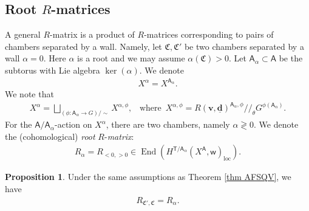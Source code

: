 \documentclass[10pt]{amsart}
\theoremstyle{definition}
\newtheorem{Proposition}[Theorem]{Proposition}
\numberwithin{equation}{section}
\newcommand{\bR}{\mathbb{R}}
\newcommand{\bZ}{\mathbb{Z}}
\newcommand{\bv}{\mathbf{v}}
\newcommand{\bd}{\mathbf{d}}
\newcommand{\fC}{\mathfrak{C}}
\newcommand{\sA}{\mathsf{A}}
\newcommand{\sT}{\mathsf{T}}
\newcommand{\sw}{\mathsf{w}}
\newcommand{\End}{\operatorname{End}}
\begin{document}
\subsection{Root \texorpdfstring{$R$}{R}-matrices}
A general $R$-matrix is a product of $R$-matrices corresponding to pairs of chambers separated by a wall. Namely, let $\fC,\fC'$ be two chambers separated by a wall $\alpha=0$. Here $\alpha$ is a root and we may assume $\alpha(\fC)>0$. Let $\sA_\alpha\subset \sA$ be the subtorus with Lie algebra $\ker(\alpha)$. We denote
\begin{align*}
    X^\alpha=X^{\sA_\alpha}.
\end{align*}
We note that
\begin{align*}
    X^\alpha=\bigsqcup_{(\phi\colon \sA_\alpha\to G)/\sim} X^{\alpha,\phi},\,\,\, \text{ where }\, X^{\alpha,\phi}=R(\bv,\underline{\bd})^{\sA_\alpha,\phi}/\!\!/_\theta G^{\phi(\sA_\alpha)}.
\end{align*}
For the $\sA/\sA_\alpha$-action on $X^\alpha$, there are two chambers, namely $\alpha\gtrless 0$. We denote the (cohomological) \textit{root} $R$-\textit{matrix}: 
\begin{align*}
    R_\alpha=R_{<0,>0}\in \End(H^{\sT/\sA_\alpha}(X^\sA,\sw)_{\mathrm{loc}}).
\end{align*}




\begin{Proposition}\label{prop root R-matrix}
Under the same assumptions as Theorem \ref{thm AFSQV}, we have
\begin{align}
    R_{\fC',\fC}=R_\alpha.
\end{align}
\end{Proposition}
\end{document}
